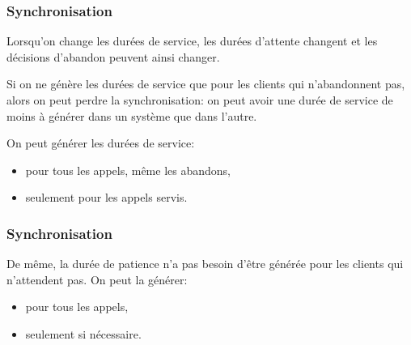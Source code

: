 \documentclass[t,usepdftitle=false]{beamer}
\begin{document}
\begin{frame}
\frametitle{Synchronisation}

Lorsqu'on change les durées de service, les durées d'attente changent
et les décisions d'abandon peuvent ainsi changer.

\mbox{}

Si on ne génère les durées de service que pour les clients qui 
n'abandonnent pas, alors on peut perdre la synchronisation:
on peut avoir une durée de service de moins \`a générer dans 
un système que dans l'autre.

\mbox{}

On peut générer les durées de service:
%
\begin{itemize}
\item[(a)] 
  pour tous les appels, m\^eme les abandons,
\item[(b)] 
  seulement pour les appels servis.
\end{itemize}

\end{frame}

\begin{frame}
\frametitle{Synchronisation}

De m\^eme, la durée de patience n'a pas besoin d'\^etre générée pour 
les clients qui n'attendent pas.  On peut la générer:
\begin{itemize}
\item[(c)] 
  pour tous les appels,
\item[(d)] 
  seulement si nécessaire.
\end{itemize}

\end{frame}
\end{document}
